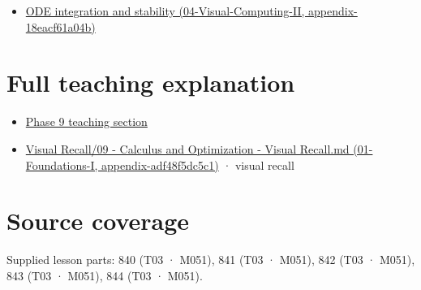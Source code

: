 \begin{itemize}
\tightlist
\item
  \href{../04-Visual-Computing-II/main.pdf\#nameddest=appendix-18eacf61a04b}{ODE integration and stability (04-Visual-Computing-II, appendix-18eacf61a04b)}
\end{itemize}

\section{Full teaching explanation}\label{appendix-8f96f9c4d5bc-full-teaching-explanation}

\begin{itemize}
\tightlist
\item
  \href{Continuous\%20Notes/Computing\%20Foundations\%20-\%20From\%20Bits\%20to\%20C++\%20and\%20Systems\%20APIs\#ODEs\%20and\%20numerical\%20simulation}{Phase 9 teaching section}
\item
  \href{../01-Foundations-I/main.pdf\#nameddest=appendix-adf48f5dc5c1}{Visual Recall/09 - Calculus and Optimization - Visual Recall.md (01-Foundations-I, appendix-adf48f5dc5c1)} · visual recall
\end{itemize}

\section{Source coverage}\label{appendix-8f96f9c4d5bc-source-coverage}

Supplied lesson parts: 840 (T03 · M051), 841 (T03 · M051), 842 (T03 · M051), 843 (T03 · M051), 844 (T03 · M051).
